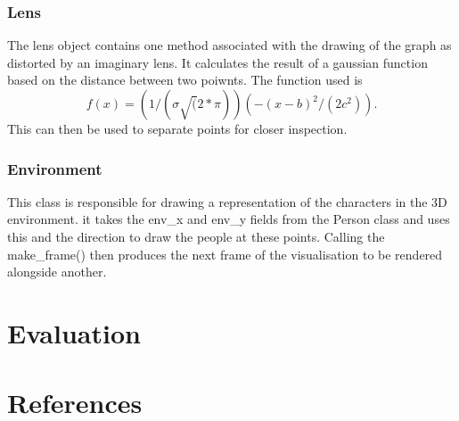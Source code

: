 \documentclass[12pt,a4paper]{article}
\begin{document}
\subsubsection{Lens}
The lens object contains one method associated with the drawing of the graph as distorted by an imaginary lens. It calculates the result of a gaussian function based on the distance between two poiwnts. The function used is
\begin{equation}
f(x)=(1/(\sigma\sqrt(2*\pi))(-(x-b)^2/(2c^2)).
\end{equation}
This can then be used to separate points for closer inspection.

\subsubsection{Environment}
This class is responsible for drawing a representation of the characters in the 3D environment. it takes the env\_x and env\_y fields from the Person class and uses this and the direction to draw the people at these points. Calling the make\_frame() then produces the next frame of the visualisation to be rendered alongside another.

\section{Evaluation}


\section{References}


\end{document}
